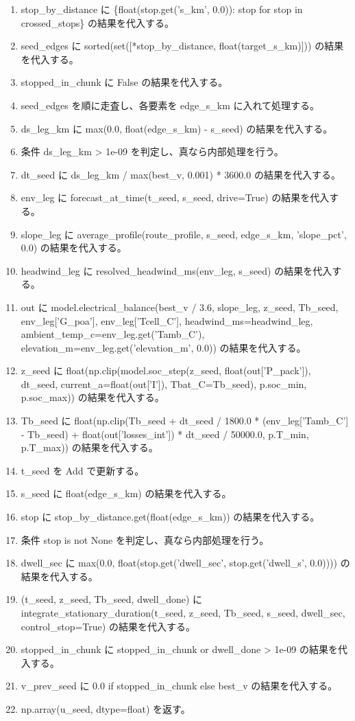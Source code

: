 \documentclass[a4paper,11pt]{article}
\begin{document}
\begin{enumerate}[leftmargin=1.8em]
\item   stop\_by\_distance に \{float(stop.get('s\_km', 0.0)): stop for stop in crossed\_stops\} の結果を代入する。
\item   seed\_edges に sorted(set([*stop\_by\_distance, float(target\_s\_km)])) の結果を代入する。
\item   stopped\_in\_chunk に False の結果を代入する。
\item   seed\_edges を順に走査し、各要素を edge\_s\_km に入れて処理する。
\item     ds\_leg\_km に max(0.0, float(edge\_s\_km) - s\_seed) の結果を代入する。
\item     条件 ds\_leg\_km > 1e-09 を判定し、真なら内部処理を行う。
\item       dt\_seed に ds\_leg\_km / max(best\_v, 0.001) * 3600.0 の結果を代入する。
\item       env\_leg に forecast\_at\_time(t\_seed, s\_seed, drive=True) の結果を代入する。
\item       slope\_leg に average\_profile(route\_profile, s\_seed, edge\_s\_km, 'slope\_pct', 0.0) の結果を代入する。
\item       headwind\_leg に resolved\_headwind\_ms(env\_leg, s\_seed) の結果を代入する。
\item       out に model.electrical\_balance(best\_v / 3.6, slope\_leg, z\_seed, Tb\_seed, env\_leg['G\_poa'], env\_leg['Tcell\_C'], headwind\_ms=headwind\_leg, ambient\_temp\_c=env\_leg.get('Tamb\_C'), elevation\_m=env\_leg.get('elevation\_m', 0.0)) の結果を代入する。
\item       z\_seed に float(np.clip(model.soc\_step(z\_seed, float(out['P\_pack']), dt\_seed, current\_a=float(out['I']), Tbat\_C=Tb\_seed), p.soc\_min, p.soc\_max)) の結果を代入する。
\item       Tb\_seed に float(np.clip(Tb\_seed + dt\_seed / 1800.0 * (env\_leg['Tamb\_C'] - Tb\_seed) + float(out['losses\_int']) * dt\_seed / 50000.0, p.T\_min, p.T\_max)) の結果を代入する。
\item       t\_seed を Add で更新する。
\item       s\_seed に float(edge\_s\_km) の結果を代入する。
\item     stop に stop\_by\_distance.get(float(edge\_s\_km)) の結果を代入する。
\item     条件 stop is not None を判定し、真なら内部処理を行う。
\item       dwell\_sec に max(0.0, float(stop.get('dwell\_sec', stop.get('dwell\_s', 0.0)))) の結果を代入する。
\item       (t\_seed, z\_seed, Tb\_seed, dwell\_done) に integrate\_stationary\_duration(t\_seed, z\_seed, Tb\_seed, s\_seed, dwell\_sec, control\_stop=True) の結果を代入する。
\item       stopped\_in\_chunk に stopped\_in\_chunk or dwell\_done > 1e-09 の結果を代入する。
\item   v\_prev\_seed に 0.0 if stopped\_in\_chunk else best\_v の結果を代入する。
\item np.array(u\_seed, dtype=float) を返す。
            \end{enumerate}
\end{document}
